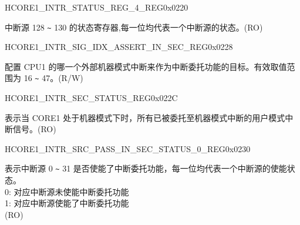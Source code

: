 \begin{register}{H}{CORE1\_INTR\_STATUS\_REG\_4\_REG}{0x0220}\label{regdesc:CORE1INTRSTATUSREG4REG}
%
\regnewline%
\begin{regdesc}\begin{reglist}
\label{fielddesc:CORE1INTRSTATUS4}\item [CORE1\_INTR\_STATUS\_4] 中断源 128 \verb+~+ 130 的状态寄存器,每一位均代表一个中断源的状态。(RO)
\end{reglist}\end{regdesc}
\end{register}

\begin{register}{H}{CORE1\_INTR\_SIG\_IDX\_ASSERT\_IN\_SEC\_REG}{0x0228}\label{regdesc:CORE1INTRSIGIDXASSERTINSECREG}
%
%
\regnewline%
\begin{regdesc}\begin{reglist}
\label{fielddesc:CORE1INTRSIGIDXASSERTINSEC}\item [CORE1\_INTR\_SIG\_IDX\_ASSERT\_IN\_SEC] 配置 CPU1 的哪一个外部机器模式中断来作为中断委托功能的目标。有效取值范围为 16 \verb+~+ 47。(R/W)
\end{reglist}\end{regdesc}
\end{register}

\begin{register}{H}{CORE1\_INTR\_SEC\_STATUS\_REG}{0x022C}\label{regdesc:CORE1INTRSECSTATUSREG}
%
\regnewline%
\begin{regdesc}\begin{reglist}
\label{fielddesc:CORE1INTRSECSTATUS3}\item [CORE1\_INTR\_SEC\_STATUS] 表示当 CORE1 处于机器模式下时，所有已被委托至机器模式中断的用户模式中断信号。(RO)
\end{reglist}\end{regdesc}
\end{register}

\begin{register}{H}{CORE1\_INTR\_SRC\_PASS\_IN\_SEC\_STATUS\_0\_REG}{0x0230}\label{regdesc:CORE1INTRSRCPASSINSECSTATUS0REG}
%
\regnewline%
\begin{regdesc}\begin{reglist}
\label{fielddesc:CORE1INTRSRCPASSINSECSTATUS0}\item [CORE1\_INTR\_SRC\_PASS\_IN\_SEC\_STATUS\_0] 表示中断源 0 \verb+~+ 31 是否使能了中断委托功能，每一位均代表一个中断源的使能状态。\\
0: 对应中断源未使能中断委托功能\\
1: 对应中断源使能了中断委托功能\\
(RO)
\end{reglist}\end{regdesc}
\end{register}

